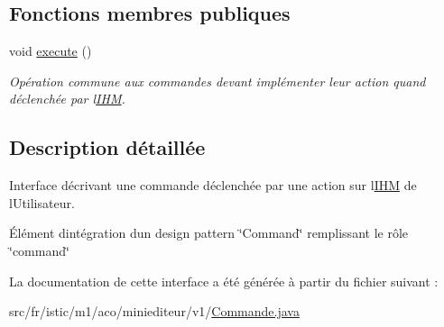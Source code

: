 \subsection*{Fonctions membres publiques}
\begin{DoxyCompactItemize}
\item 
\mbox{\label{interfacefr_1_1istic_1_1m1_1_1aco_1_1miniediteur_1_1v1_1_1Commande_a87a8a55bac4e81e32339248f79f7de4f}} 
void \hyperlink{interfacefr_1_1istic_1_1m1_1_1aco_1_1miniediteur_1_1v1_1_1Commande_a87a8a55bac4e81e32339248f79f7de4f}{execute} ()
\begin{DoxyCompactList}\small\item\em Opération commune aux commandes devant implémenter leur action quand déclenchée par l\textquotesingle{}\hyperlink{interfacefr_1_1istic_1_1m1_1_1aco_1_1miniediteur_1_1v1_1_1IHM}{I\+HM}. \end{DoxyCompactList}\end{DoxyCompactItemize}


\subsection{Description détaillée}
Interface décrivant une commande déclenchée par une action sur l\textquotesingle{}\hyperlink{interfacefr_1_1istic_1_1m1_1_1aco_1_1miniediteur_1_1v1_1_1IHM}{I\+HM} de l\textquotesingle{}Utilisateur. 

Élément d\textquotesingle{}intégration d\textquotesingle{}un design pattern \char`\"{}\+Command\char`\"{} remplissant le rôle \char`\"{}command\char`\"{} 

La documentation de cette interface a été générée à partir du fichier suivant \+:\begin{DoxyCompactItemize}
\item 
src/fr/istic/m1/aco/miniediteur/v1/\hyperlink{Commande_8java}{Commande.\+java}\end{DoxyCompactItemize}
